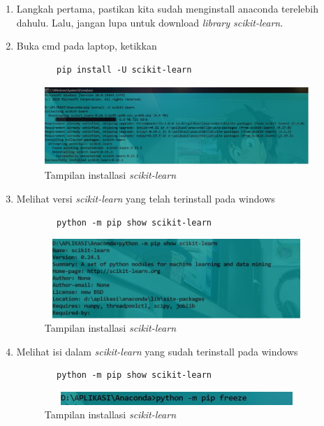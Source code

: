 \documentclass{article}
\begin{document}
\begin{enumerate}

    \item Langkah pertama, pastikan kita sudah menginstall anaconda terelebih dahulu. Lalu, jangan lupa untuk download \textit{library scikit-learn}. 
    
    \item Buka cmd pada laptop, ketikkan \begin{verbatim}
        pip install -U scikit-learn \end{verbatim}
    \begin{figure}[!htbp]
            \centering
            \includegraphics[width=10cm,height=3cm]{figures/1184101/chapter1/1.jpeg}
            \caption{Tampilan installasi \textit{scikit-learn}}
            \label{penanda}
            \end{figure}
    
    \item Melihat versi \textit{scikit-learn} yang telah terinstall pada windows \begin{verbatim}
        python -m pip show scikit-learn \end{verbatim}
    \begin{figure}[!htbp]
            \centering
            \includegraphics[width=10cm,height=3cm]{figures/1184101/chapter1/2.jpeg}
            \caption{Tampilan installasi \textit{scikit-learn}}
            \label{penanda}
            \end{figure}
    
    \item Melihat isi dalam \textit{scikit-learn} yang sudah terinstall pada windows\begin{verbatim}
        python -m pip show scikit-learn \end{verbatim}
    \begin{figure}[!htbp]
            \centering
            \includegraphics[width=10cm,height=0.5cm]{figures/1184101/chapter1/3.jpeg}
            \caption{Tampilan installasi \textit{scikit-learn}}
            \label{penanda}
            \end{figure}
    \end{enumerate}
    
\end{document}
